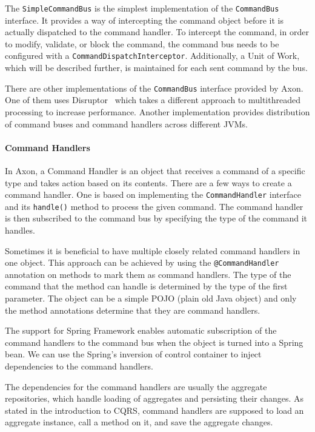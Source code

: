 \documentclass{book}
\begin{document}
The \texttt{SimpleCommandBus} is the simplest implementation of the
\texttt{CommandBus} interface. It provides a way of intercepting the
command object before it is actually dispatched to the command handler.
To intercept the command, in order to modify, validate, or block the
command, the command bus needs to be configured with a
\texttt{CommandDispatchInterceptor}. Additionally, a Unit of Work, which
will be described further, is maintained for each sent command by the
bus.

There are other implementations of the \texttt{CommandBus} interface
provided by Axon. One of them uses Disruptor~\cite{disruptor} which
takes a different approach to multithreaded processing to increase
performance. Another implementation provides distribution of command
buses and command handlers across different JVMs.

\paragraph{Command Handlers}\label{command-handlers}

In Axon, a Command Handler is an object that receives a command of a
specific type and takes action based on its contents. There are a few
ways to create a command handler. One is based on implementing the
\texttt{CommandHandler} interface and its \texttt{handle()} method to
process the given command. The command handler is then subscribed to the
command bus by specifying the type of the command it handles.

Sometimes it is beneficial to have multiple closely related command
handlers in one object. This approach can be achieved by using the
\texttt{@CommandHandler} annotation on methods to mark them as command
handlers. The type of the command that the method can handle is
determined by the type of the first parameter. The object can be a
simple POJO (plain old Java object) and only the method annotations
determine that they are command handlers.

The support for Spring Framework enables automatic subscription of the
command handlers to the command bus when the object is turned into a
Spring bean. We can use the Spring's inversion of control container to
inject dependencies to the command handlers.

The dependencies for the command handlers are usually the aggregate
repositories, which handle loading of aggregates and persisting their
changes. As stated in the introduction to CQRS, command handlers are
supposed to load an aggregate instance, call a method on it, and save
the aggregate changes.
\end{document}

